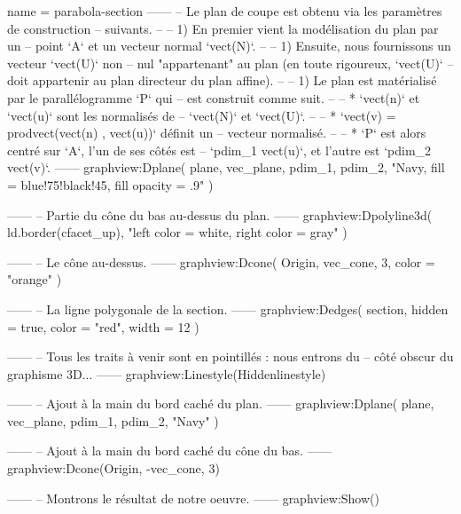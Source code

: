 \documentclass[border = 3pt]{standalone}
\begin{document}
\begin{luadraw*}{name = parabola-section}
------
-- Le plan de coupe est obtenu via les paramètres de construction
-- suivants.
--
--     1) En premier vient la modélisation du plan par un
--     point `A` et un vecteur normal `vect(N)`.
--
--     1) Ensuite, nous fournissons un vecteur `vect(U)` non
--     nul "appartenant" au plan (en toute rigoureux, `vect(U)`
--     doit appartenir au plan directeur du plan affine).
--
--     1) Le plan est matérialisé par le parallélogramme `P` qui
--     est construit comme suit.
--
--         * `vect(n)` et `vect(u)` sont les normalisés de
--         `vect(N)` et `vect(U)`.
--
--         * `vect(v) = prodvect(vect(n) , vect(u))` définit un
--         vecteur normalisé.
--
--         * `P` est alors centré sur `A`, l'un de ses côtés est
--         `pdim_1 vect(u)`, et l'autre est `pdim_2 vect(v)`.
------
graphview:Dplane(
  plane,
  vec_plane, pdim_1, pdim_2,
  "Navy, fill = blue!75!black!45, fill opacity = .9"
)

------
-- Partie du cône du bas au-dessus du plan.
------
graphview:Dpolyline3d(
  ld.border(cfacet_up),
  "left color = white, right color = gray"
)

------
-- Le cône au-dessus.
------
graphview:Dcone(
  Origin, vec_cone, 3,
  {
    color = "orange"
  }
)

------
-- La ligne polygonale de la section.
------
graphview:Dedges(
  section,
  {
    hidden = true, color = "red", width = 12
  }
)

------
-- Tous les traits à venir sont en pointillés : nous entrons du
-- côté obscur du graphisme 3D...
------
graphview:Linestyle(Hiddenlinestyle)

------
-- Ajout à la main du bord caché du plan.
------
graphview:Dplane(
  plane,
  vec_plane, pdim_1, pdim_2,
  "Navy"
)

------
-- Ajout à la main du bord caché du cône du bas.
------
graphview:Dcone(Origin, -vec_cone, 3)

------
-- Montrons le résultat de notre oeuvre.
------
graphview:Show()
\end{luadraw*}
\end{document}
